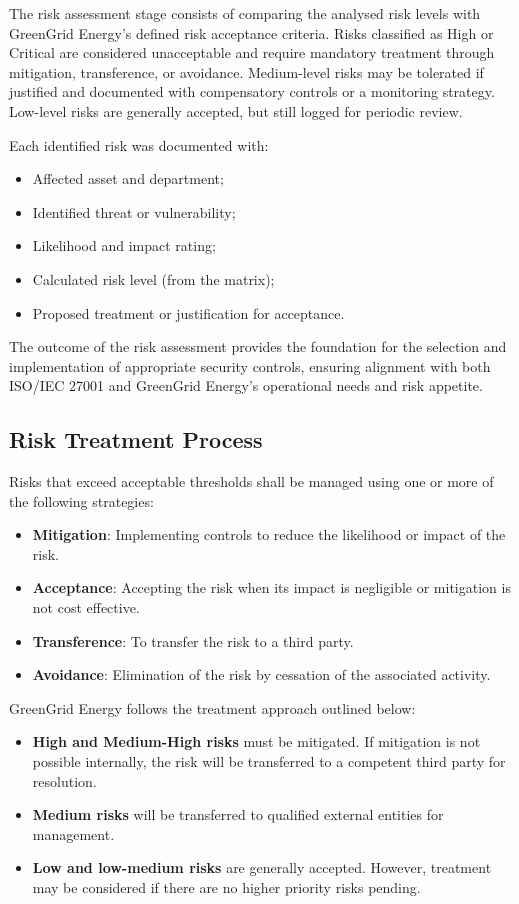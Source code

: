 The risk assessment stage consists of comparing the analysed risk levels with GreenGrid Energy’s defined risk acceptance criteria. Risks classified as High or Critical are considered unacceptable and require mandatory treatment through mitigation, transference, or avoidance. Medium-level risks may be tolerated if justified and documented with compensatory controls or a monitoring strategy. Low-level risks are generally accepted, but still logged for periodic review.

Each identified risk was documented with:
\begin{itemize}
    \item Affected asset and department;
    \item Identified threat or vulnerability;
    \item Likelihood and impact rating;
    \item Calculated risk level (from the matrix);
    \item Proposed treatment or justification for acceptance.
\end{itemize}

The outcome of the risk assessment provides the foundation for the selection and implementation of appropriate security controls, ensuring alignment with both ISO/IEC 27001 and GreenGrid Energy’s operational needs and risk appetite.


\subsection{Risk Treatment Process}
\label{sec:risk_treatment}

Risks that exceed acceptable thresholds shall be managed using one or more of the following strategies:
\begin{itemize}
    \item \textbf{Mitigation}: Implementing controls to reduce the likelihood or impact of the risk.
    \item \textbf{Acceptance}: Accepting the risk when its impact is negligible or mitigation is not cost effective.
    \item \textbf{Transference}: To transfer the risk to a third party.
    \item \textbf{Avoidance}: Elimination of the risk by cessation of the associated activity.
\end{itemize}

GreenGrid Energy follows the treatment approach outlined below:
\begin{itemize}
    \item \textbf{High and Medium-High risks} must be mitigated. If mitigation is not possible internally, the risk will be transferred to a competent third party for resolution.
    \item \textbf{Medium risks} will be transferred to qualified external entities for management.
    \item \textbf{Low and low-medium risks} are generally accepted. However, treatment may be considered if there are no higher priority risks pending.
\end{itemize}

